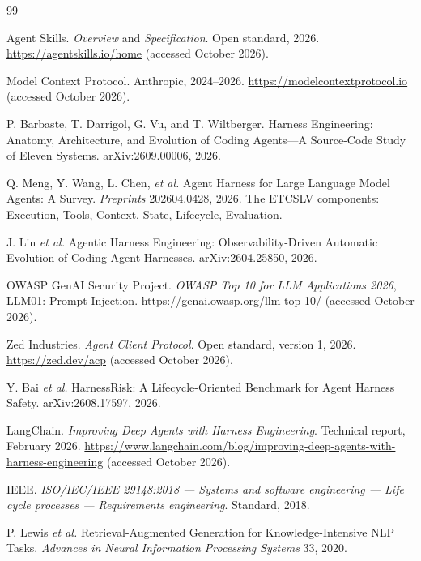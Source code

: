 \documentclass[10pt,a4paper]{article}
\theoremstyle{definition}
\theoremstyle{plain}
\theoremstyle{principle}
\begin{document}
\begin{thebibliography}{99}
\footnotesize
\setlength{\itemsep}{1pt}
\setlength{\parsep}{0pt}

Agent Skills. \emph{Overview} and \emph{Specification}. Open standard, 2026.
\url{https://agentskills.io/home} (accessed October 2026).

Model Context Protocol. Anthropic, 2024--2026.
\url{https://modelcontextprotocol.io} (accessed October 2026).

P. Barbaste, T. Darrigol, G. Vu, and T. Wiltberger. Harness Engineering: Anatomy, Architecture,
and Evolution of Coding Agents---A Source-Code Study of Eleven Systems. arXiv:2609.00006, 2026.

Q. Meng, Y. Wang, L. Chen, \emph{et al.} Agent Harness for Large Language Model Agents: A
Survey. \emph{Preprints} 202604.0428, 2026. The ETCSLV components: Execution, Tools, Context,
State, Lifecycle, Evaluation.

J. Lin \emph{et al.} Agentic Harness Engineering: Observability-Driven Automatic Evolution of
Coding-Agent Harnesses. arXiv:2604.25850, 2026.

OWASP GenAI Security Project. \emph{OWASP Top 10 for LLM Applications 2026}, LLM01: Prompt
Injection. \url{https://genai.owasp.org/llm-top-10/} (accessed October 2026).

Zed Industries. \emph{Agent Client Protocol}. Open standard, version 1, 2026.
\url{https://zed.dev/acp} (accessed October 2026).

Y. Bai \emph{et al.} HarnessRisk: A Lifecycle-Oriented Benchmark for Agent Harness Safety.
arXiv:2608.17597, 2026.

LangChain. \emph{Improving Deep Agents with Harness Engineering}. Technical report, February
2026. \url{https://www.langchain.com/blog/improving-deep-agents-with-harness-engineering}
(accessed October 2026).

IEEE. \emph{ISO/IEC/IEEE 29148:2018 --- Systems and software engineering --- Life cycle
processes --- Requirements engineering}. Standard, 2018.

P. Lewis \emph{et al.} Retrieval-Augmented Generation for Knowledge-Intensive NLP Tasks.
\emph{Advances in Neural Information Processing Systems} 33, 2020.


\end{thebibliography}
\end{document}
